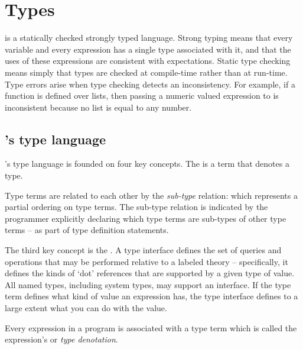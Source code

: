 \chapter{Types}
\label{types}

\go is a statically checked strongly typed language. 
Strong typing means that every variable and every expression has a single type associated with it, and that the uses of these expressions are consistent with expectations. Static type checking means simply that types are checked at compile-time rather than at run-time.  Type errors arise when type checking detects an inconsistency. For example, if a function  is defined over lists, then passing a numeric valued expression to  is inconsistent because no list is equal to any number. 

\section{\go's type language}
\go's type language is founded on four key concepts. The  is a term that denotes a type.

Type terms are related to each other by the \emph{sub-type} relation: which represents a partial ordering on type terms. The sub-type relation is indicated by the programmer explicitly declaring which type terms are sub-types of other type terms -- as part of type definition statements.

The third key concept is the . A type interface defines the set of queries and operations that may be performed relative to a labeled theory -- specifically, it defines the kinds of `dot' references that are supported by a given type of value. All named types, including system types, may support an interface. If the type term defines what kind of value an expression has, the type interface defines to a large extent what you can do with the value.

Every expression in a \go program is associated with a type term which is called the expression's  or \emph{type denotation}.

